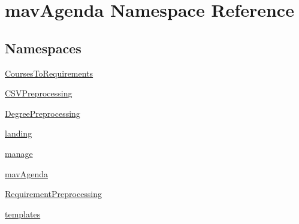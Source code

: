 \hypertarget{namespacemavAgenda}{}\section{mav\+Agenda Namespace Reference}
\label{namespacemavAgenda}
\subsection*{Namespaces}
\begin{DoxyCompactItemize}
\item 
 \mbox{\hyperlink{namespacemavAgenda_1_1CoursesToRequirements}{Courses\+To\+Requirements}}
\item 
 \mbox{\hyperlink{namespacemavAgenda_1_1CSVPreprocessing}{C\+S\+V\+Preprocessing}}
\item 
 \mbox{\hyperlink{namespacemavAgenda_1_1DegreePreprocessing}{Degree\+Preprocessing}}
\item 
 \mbox{\hyperlink{namespacemavAgenda_1_1landing}{landing}}
\item 
 \mbox{\hyperlink{namespacemavAgenda_1_1manage}{manage}}
\item 
 \mbox{\hyperlink{namespacemavAgenda_1_1mavAgenda}{mav\+Agenda}}
\item 
 \mbox{\hyperlink{namespacemavAgenda_1_1RequirementPreprocessing}{Requirement\+Preprocessing}}
\item 
 \mbox{\hyperlink{namespacemavAgenda_1_1templates}{templates}}
\end{DoxyCompactItemize}
